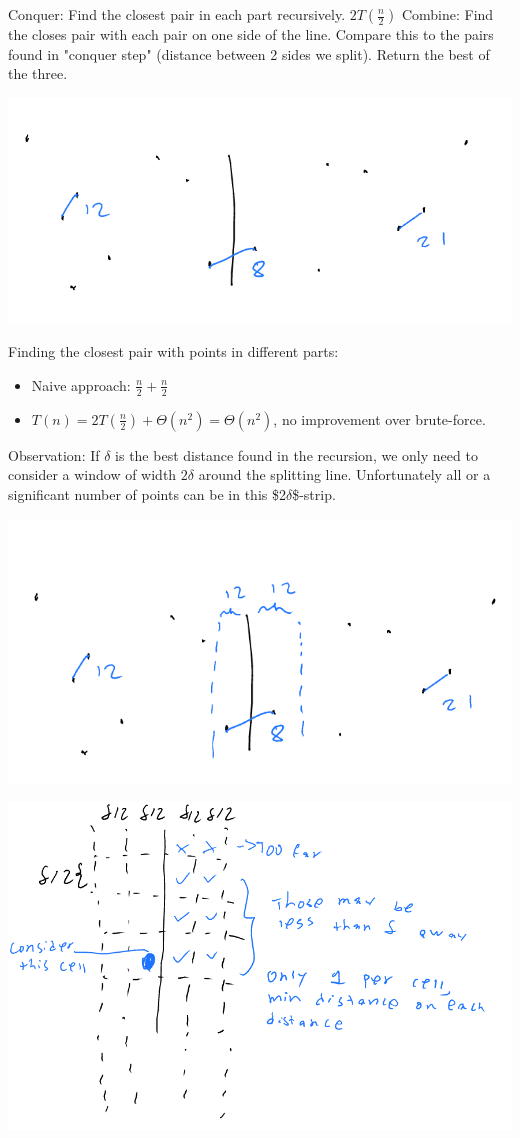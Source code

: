 \documentclass[11pt]{article}
\begin{document}
Conquer: Find the closest pair in each part recursively. \(2T(\frac{n}{2})\)
Combine: Find the closes pair with each pair on one side of the line. Compare this to the pairs found in "conquer step" (distance between 2 sides we split). Return the best of the three.
\begin{center}
\includegraphics[width=.9\linewidth]{./Images/i76.png}
\end{center}
Finding the closest pair with points in different parts: 
\begin{itemize}
\item Naive approach: \(\frac{n}{2}+\frac{n}{2}\)
\item \(T(n)=2T(\frac{n}{2})+\Theta(n^2) = \Theta(n^2)\), no improvement over brute-force.
\end{itemize}
Observation: If \(\delta\) is the best distance found in the recursion, we only need to consider a window of width \(2\delta\) around the splitting line. Unfortunately all or a significant number of points can be in this \$2\(\delta\)\$-strip.
\begin{center}
\includegraphics[width=.9\linewidth]{./Images/i77.png}
\end{center}
\begin{center}
\includegraphics[width=.9\linewidth]{./Images/i78.png}
\end{center}
\end{document}
